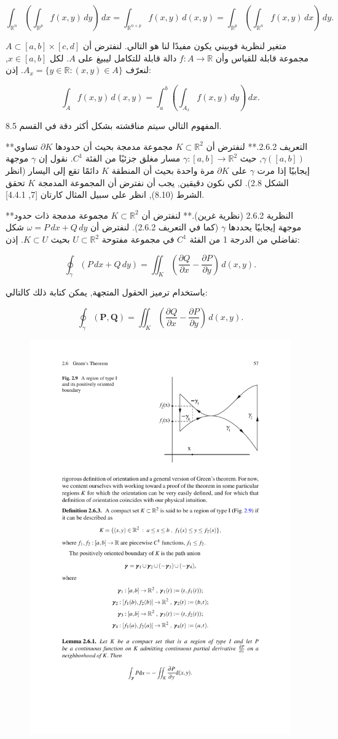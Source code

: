 \[ \int_{\mathbb{R}^n} \left( \int_{\mathbb{R}^p} f(x, y) \, dy \right) \, dx = \int_{\mathbb{R}^{n+p}} f(x, y) \, d(x, y) = \int_{\mathbb{R}^p} \left( \int_{\mathbb{R}^n} f(x, y) \, dx \right) \, dy. \]

متغير لنظرية فوبيني يكون مفيدًا لنا هو التالي. لنفترض أن \( A \subset [a, b] \times [c, d] \) مجموعة قابلة للقياس وأن \( f : A \to \mathbb{R} \) دالة قابلة للتكامل ليبيغ على \( A \). لكل \( x \in [a, b] \), لنعرّف \( A_x = \{ y \in \mathbb{R} : (x, y) \in A \} \). إذن:

\[ \int_A f(x, y) \, d(x, y) = \int_a^b \left( \int_{A_x} f(x, y) \, dy \right) \, dx. \]

المفهوم التالي سيتم مناقشته بشكل أكثر دقة في القسم 8.5.

**التعريف 2.6.2.** لنفترض أن \( K \subset \mathbb{R}^2 \) مجموعة مدمجة بحيث أن حدودها \( \partial K \) تساوي \( \gamma([a, b]) \), حيث \( \gamma : [a, b] \to \mathbb{R}^2 \) مسار مغلق جزئيًا من الفئة \( C^1 \). نقول إن \( \gamma \) موجهة إيجابيًا إذا مرت \( \gamma \) على \( \partial K \) مرة واحدة بحيث أن المنطقة \( K \) دائمًا تقع إلى اليسار (انظر الشكل 2.8). لكي نكون دقيقين, يجب أن نفترض أن المجموعة المدمجة \( K \) تحقق الشرط (8.10), انظر على سبيل المثال كارتان [7, 4.4.1].

**النظرية 2.6.2 (نظرية غرين).** لنفترض أن \( K \subset \mathbb{R}^2 \) مجموعة مدمجة ذات حدود موجهة إيجابيًا يحددها \( \gamma \) (كما في التعريف 2.6.2). لنفترض أن \( \omega = P \, dx + Q \, dy \) شكل تفاضلي من الدرجة 1 من الفئة \( C^1 \) في مجموعة مفتوحة \( U \subset \mathbb{R}^2 \) بحيث \( K \subset U \). إذن:

\[ \oint_{\gamma} (P \, dx + Q \, dy) = \iint_K \left( \frac{\partial Q}{\partial x} - \frac{\partial P}{\partial y} \right) \, d(x, y). \]

باستخدام ترميز الحقول المتجهة, يمكن كتابة ذلك كالتالي:

\[ \oint_{\gamma} (\mathbf{P}, \mathbf{Q}) = \iint_K \left( \frac{\partial Q}{\partial x} - \frac{\partial P}{\partial y} \right) \, d(x, y). \]

\begin{figure}
    \centering
    \includegraphics[width=0.5\linewidth]{regoin of type I.pdf}
    \caption{}
    \label{fig:enter-label}
\end{figure}

